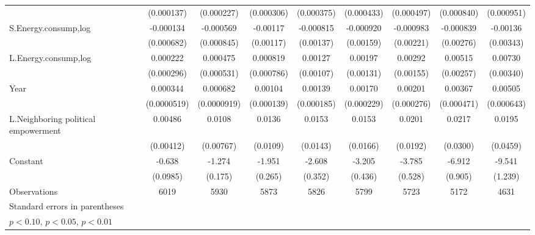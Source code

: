 \begin{table}[htbp]
\begin{tabular}{l*{8}{c}}
                    &  (0.000137)         &  (0.000227)         &  (0.000306)         &  (0.000375)         &  (0.000433)         &  (0.000497)         &  (0.000840)         &  (0.000951)         \\
[1em]
S.Energy.consump,log&   -0.000134         &   -0.000569         &    -0.00117         &   -0.000815         &   -0.000920         &   -0.000983         &   -0.000839         &    -0.00136         \\
                    &  (0.000682)         &  (0.000845)         &   (0.00117)         &   (0.00137)         &   (0.00159)         &   (0.00221)         &   (0.00276)         &   (0.00343)         \\
[1em]
L.Energy.consump,log&    0.000222         &    0.000475         &    0.000819         &     0.00127         &     0.00197         &     0.00292\sym{*}  &     0.00515\sym{**} &     0.00730\sym{**} \\
                    &  (0.000296)         &  (0.000531)         &  (0.000786)         &   (0.00107)         &   (0.00131)         &   (0.00155)         &   (0.00257)         &   (0.00340)         \\
[1em]
Year                &    0.000344\sym{***}&    0.000682\sym{***}&     0.00104\sym{***}&     0.00139\sym{***}&     0.00170\sym{***}&     0.00201\sym{***}&     0.00367\sym{***}&     0.00505\sym{***}\\
                    & (0.0000519)         & (0.0000919)         &  (0.000139)         &  (0.000185)         &  (0.000229)         &  (0.000276)         &  (0.000471)         &  (0.000643)         \\
[1em]
L.Neighboring political empowerment&     0.00486         &      0.0108         &      0.0136         &      0.0153         &      0.0153         &      0.0201         &      0.0217         &      0.0195         \\
                    &   (0.00412)         &   (0.00767)         &    (0.0109)         &    (0.0143)         &    (0.0166)         &    (0.0192)         &    (0.0300)         &    (0.0459)         \\
[1em]
Constant            &      -0.638\sym{***}&      -1.274\sym{***}&      -1.951\sym{***}&      -2.608\sym{***}&      -3.205\sym{***}&      -3.785\sym{***}&      -6.912\sym{***}&      -9.541\sym{***}\\
                    &    (0.0985)         &     (0.175)         &     (0.265)         &     (0.352)         &     (0.436)         &     (0.528)         &     (0.905)         &     (1.239)         \\
\hline
Observations        &        6019         &        5930         &        5873         &        5826         &        5799         &        5723         &        5172         &        4631         \\
\hline\hline
\multicolumn{9}{l}{\footnotesize Standard errors in parentheses}\\
\multicolumn{9}{l}{\footnotesize \sym{*} \(p<0.10\), \sym{**} \(p<0.05\), \sym{***} \(p<0.01\)}\\
\end{tabular}
\end{table}
